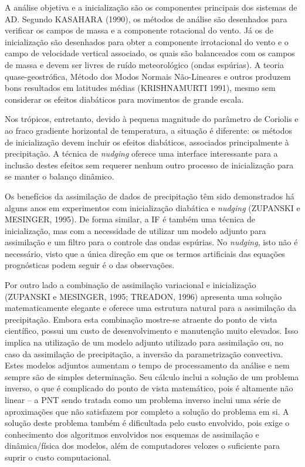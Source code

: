 A análise objetiva e a inicialização são os componentes principais dos sistemas de AD. Segundo KASAHARA (1990), os métodos de análise são desenhados para verificar os campos de massa e a componente rotacional do vento. Já os de inicialização são desenhados para obter a componente irrotacional do vento e o campo de velocidade vertical associado, os quais são balanceados com os campos de massa e devem ser livres de ruído meteorológico (ondas espúrias). A teoria quase-geostrófica, Método dos Modos Normais Não-Lineares e outros produzem bons resultados em latitudes médias (KRISHNAMURTI 1991), mesmo sem considerar os efeitos diabáticos para movimentos de grande escala. 

Nos trópicos, entretanto, devido à pequena magnitude do parâmetro de Coriolis e ao fraco gradiente horizontal de temperatura, a situação é diferente: os métodos de inicialização devem incluir os efeitos diabáticos, associados principalmente à precipitação. A técnica de \textit{nudging} oferece uma interface interessante para a inclusão destes efeitos sem requerer nenhum outro processo de inicialização para se manter o balanço dinâmico.

Os benefícios da assimilação de dados de precipitação têm sido demonstrados há alguns anos em experimentos com inicialização diabática e \textit{nudging} (ZUPANSKI e MESINGER, 1995). De forma similar, a IF é também uma técnica de inicialização, mas com a necessidade de utilizar um modelo adjunto para assimilação e um filtro para o controle das ondas espúrias. No \textit{nudging}, isto não é necessário, visto que a única direção em que os termos artificiais das equações prognósticas podem seguir é o das observações.

Por outro lado a combinação de assimilação variacional e inicialização (ZUPANSKI e MESINGER, 1995; TREADON, 1996) apresenta uma solução matematicamente elegante e oferece uma estrutura natural para a assimilação da precipitação. Embora esta combinação mostre-se atraente do ponto de vista científico, possui um custo de desenvolvimento e manutenção muito elevados. Isso implica na utilização de um modelo adjunto utilizado para assimilação ou, no caso da assimilação de precipitação, a inversão da parametrização convectiva. Estes modelos adjuntos aumentam o tempo de processamento da análise e nem sempre são de simples determinação. Seu cálculo inclui a solução de um problema inverso, o que é complicado do ponto de vista matemático, pois é altamente não linear – a  PNT sendo tratada como um problema inverso inclui uma série de aproximações que não satisfazem por completo a solução do problema em si. A solução deste problema também é dificultada pelo custo envolvido, pois exige o conhecimento dos algoritmos envolvidos nos esquemas de assimilação e dinâmica/física dos modelos, além de computadores velozes o suficiente para suprir o custo computacional.

